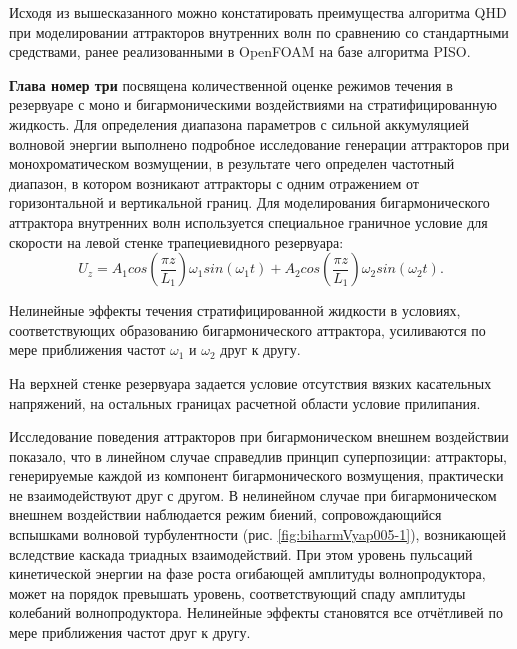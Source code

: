 \documentclass[utf8x]{G7-32} %
\begin{document}
Исходя из вышесказанного можно констатировать преимущества алгоритма QHD при моделировании аттракторов внутренних волн по сравнению со стандартными средствами, ранее реализованными в OpenFOAM на базе алгоритма PISO. 


\textbf{Глава номер три} посвящена количественной оценке режимов течения в резервуаре с моно и бигармоническими воздействиями на стратифицированную жидкость. Для определения диапазона параметров с сильной аккумуляцией волновой энергии выполнено подробное исследование генерации аттракторов при монохроматическом возмущении, в результате чего определен частотный диапазон, в котором возникают аттракторы с одним отражением от горизонтальной и вертикальной границ. Для моделирования бигармонического аттрактора внутренних волн используется специальное граничное условие для скорости на левой стенке трапециевидного резервуара:
$$U_z = A_1 cos\left(\frac{\pi z}{L_1}\right) \omega_1   sin(\omega_1 t) + A_2 cos\left(\frac{\pi z}{L_1}\right) \omega_2  sin(\omega_2 t).$$

Нелинейные эффекты течения стратифицированной жидкости в условиях, соответствующих образованию бигармонического аттрактора, усиливаются по мере приближения частот $\omega_1$ и $\omega_2$ друг к другу. 

На верхней стенке резервуара задается условие отсутствия вязких касательных напряжений, на остальных границах расчетной области условие прилипания. 

Исследование поведения аттракторов при бигармоническом внешнем воздействии показало, что в линейном случае справедлив принцип суперпозиции: аттракторы, генерируемые каждой из компонент бигармонического возмущения, практически не взаимодействуют друг с другом. В нелинейном случае при бигармоническом внешнем воздействии наблюдается режим биений, сопровождающийся вспышками волновой турбулентности (рис. \ref{fig:biharmVyap005-1}), возникающей вследствие каскада триадных взаимодействий. При этом уровень пульсаций кинетической энергии на фазе роста огибающей амплитуды волнопродуктора, может на порядок превышать уровень, соответствующий спаду амплитуды колебаний волнопродуктора. Нелинейные эффекты становятся все отчётливей по мере приближения частот друг к другу. 
\end{document}
